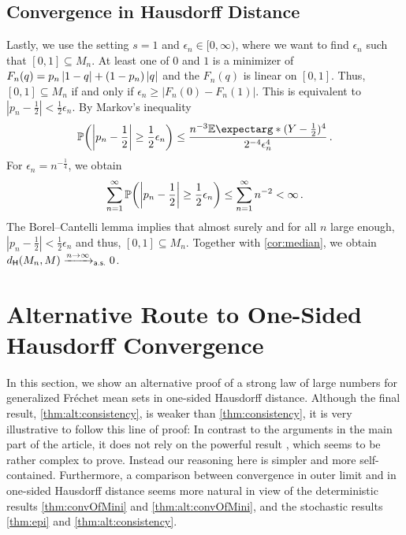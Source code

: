 \documentclass{scrartcl}
\renewcommand{\subset}{\subseteq}
\newcommand{\PrOf}[1]{\Pr\mathopen{}\lb #1 \rb\mathclose{}}
\newcommand{\Ex}{\E\expectarg}
\newcommand*{\ms}[1]{\mathsf{#1}}
\newcommand{\equationFullstop}{\, .}
\newcommand{\eqfs}{\equationFullstop}
\theoremstyle{plain}\newtheorem{theorem}{Theorem}[section]
\theoremstyle{definition}
\theoremstyle{remark}
\begin{document}
\begin{appendix}
\subsection{Convergence in Hausdorff Distance}
Lastly, we use the setting $s=1$ and $\epsilon_n\in[0,\infty)$, where we want to find $\epsilon_n$ such that $[0,1] \subset M_n$.
At least one of $0$ and $1$ is a minimizer of $F_n(q)=p_n\left| 1-q \right|+(1-p_n)\left| q \right|$ and the $F_n(q)$ is linear on $[0,1]$. Thus, $[0,1] \subset M_n$ if and only if  $\epsilon_n \geq |F_n(0)-F_n(1)|$. This is equivalent to 
 $|p_n-\frac12| < \frac12\epsilon_n$.
By Markov's inequality
\begin{equation*}
	\PrOf{\abs{p_n-\frac12} \geq \frac12\epsilon_n} \leq \frac{n^{-3} \Ex*{(Y-\frac12)^4}}{2^{-4}\epsilon_n^4}
	\eqfs
\end{equation*}
For $\epsilon_n = n^{-\frac14}$, we obtain
\begin{equation*}
	\sum_{n=1}^\infty \PrOf{\abs{p_n-\frac12} \geq \frac12\epsilon_n}  \leq \sum_{n=1}^\infty n^{-2} < \infty
	\eqfs
\end{equation*}
The Borel--Cantelli lemma implies that almost surely and for all $n$ large enough,  $|p_n-\frac12| < \frac12\epsilon_n$ and thus, $[0,1] \subset M_n$. 
Together with \autoref{cor:median}, we obtain $d_{\Hausdorff}(M_n, M) \xrightarrow{n\to\infty}_{\ms{a.s.}} 0$.
 \section{Alternative Route to One-Sided Hausdorff Convergence}\label{sec:alt}
In this section, we show an alternative proof of a strong law of large numbers for generalized Fréchet mean sets in one-sided Hausdorff distance. Although the final result, \autoref{thm:alt:consistency}, is weaker than \autoref{thm:consistency}, it is very illustrative to follow this line of proof:
In contrast to the arguments in the main part of the article, it does not rely on the powerful result \cite[Theorem 1.1]{korf01}, which seems to be rather complex to prove. Instead our reasoning here is simpler and more self-contained.
Furthermore, a comparison between convergence in outer limit and in one-sided Hausdorff distance seems more natural in view of the deterministic results \autoref{thm:convOfMini} and \autoref{thm:alt:convOfMini}, and the stochastic results \autoref{thm:epi} and \autoref{thm:alt:consistency}.

\end{appendix}
\end{document}
